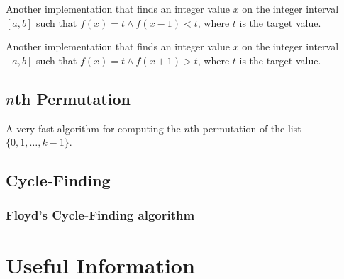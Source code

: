 \documentclass[11pt,a4paper,titlepage]{article}
\begin{document}
			Another implementation that finds an integer value $x$ on the integer interval $[a,b]$ such that $f(x) = t \land f(x - 1) < t$, where $t$ is the target value.
			

			Another implementation that finds an integer value $x$ on the integer interval $[a,b]$ such that $f(x) = t \land f(x + 1) > t$, where $t$ is the target value.
			

		\subsection{$n$th Permutation}
			A very fast algorithm for computing the $n$th permutation of the list $\{0,1,\ldots,k-1\}$.
			

		\subsection{Cycle-Finding}
			\subsubsection{Floyd's Cycle-Finding algorithm}
				

	\section{Useful Information}
\end{document}
